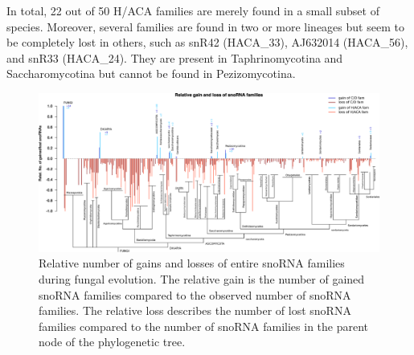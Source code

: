In total, 22 out of 50 H/ACA families are merely found in a small
subset of species. Moreover, several families are found in two or more
lineages but seem to be completely lost in others, such as snR42
(HACA\_33), AJ632014 (HACA\_56), and snR33 (HACA\_24). They are
present in Taphrinomycotina and Saccharomycotina but cannot be found
in Pezizomycotina.


\begin{figure}
  \centering
  \includegraphics[width=\textwidth]{pics/fungi_relative_gain_loss.eps}
  \caption{Relative number of gains and losses of entire snoRNA
    families during fungal evolution. The relative gain is the number
    of gained snoRNA families compared to the observed number of
    snoRNA families. The relative loss describes the number of lost
    snoRNA families compared to the number of snoRNA families in the
    parent node of the phylogenetic tree.}
\label{fig:relative_innovation_deletion_event}
\end{figure}



